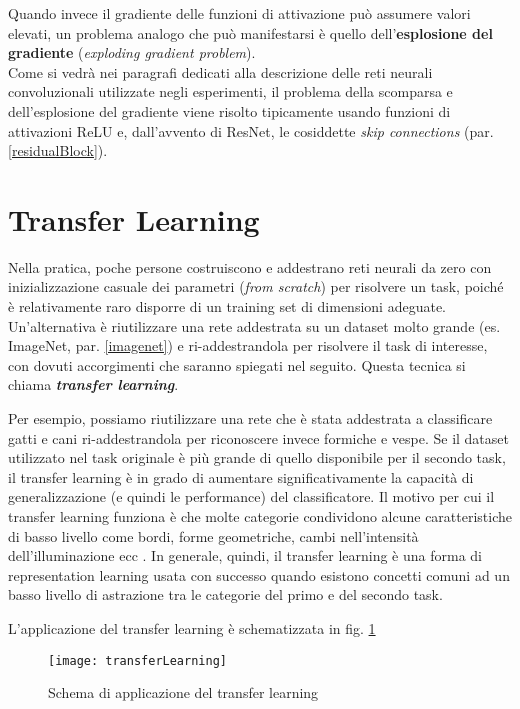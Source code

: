 Quando invece il gradiente delle funzioni di attivazione può assumere valori elevati, un problema analogo che può manifestarsi è quello dell'\textbf{esplosione del gradiente} (\textit{exploding gradient problem}).\\

Come si vedrà nei paragrafi dedicati alla descrizione delle reti neurali convoluzionali utilizzate negli esperimenti, il problema della scomparsa e dell'esplosione del gradiente viene risolto tipicamente usando funzioni di attivazioni ReLU e, dall'avvento di ResNet, le cosiddette \textit{skip connections} (par. \ref{residualBlock}).

\section{Transfer Learning}
\label{transferLearning}
Nella pratica, poche persone costruiscono e addestrano reti neurali da zero con inizializzazione casuale dei parametri (\textit{from scratch}) per risolvere un task, poiché è relativamente raro disporre di un training set di dimensioni adeguate. Un'alternativa è riutilizzare una rete addestrata su un dataset molto grande (es. ImageNet, par. \ref{imagenet}) e ri-addestrandola per risolvere il task di interesse, con dovuti accorgimenti che saranno spiegati nel seguito.
Questa tecnica si chiama \textbf{\textit{transfer learning}}.

Per esempio, possiamo riutilizzare una rete che è stata addestrata a classificare gatti e cani ri-addestrandola per riconoscere invece formiche e vespe. Se il dataset utilizzato nel task originale è più grande di quello disponibile per il secondo task, il transfer learning è in grado di aumentare significativamente la capacità di generalizzazione (e quindi le performance) del classificatore.
Il motivo per cui il transfer learning funziona è che molte categorie condividono alcune caratteristiche di basso livello come bordi, forme geometriche, cambi nell'intensità dell'illuminazione ecc \cite{howtransferable}. In generale, quindi, il transfer learning è una forma di representation learning usata con successo quando esistono concetti comuni ad un basso livello di astrazione tra le categorie del primo e del secondo task.

L'applicazione del transfer learning è schematizzata in fig. \ref{fig:transferLearning}

\begin{figure}[h!]
\centering
\texttt{[image: transferLearning]}
\caption{Schema di applicazione del transfer learning}
\label{fig:transferLearning}
\end{figure}

